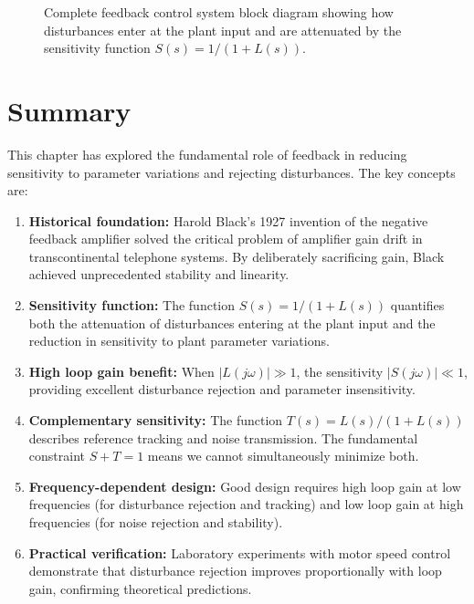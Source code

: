 \begin{figure}[htbp]
\begin{tikzpicture}[auto, node distance=2.2cm, >=latex', scale=0.85, transform shape]
\end{tikzpicture}
\caption{Complete feedback control system block diagram showing how disturbances enter at the plant input and are attenuated by the sensitivity function $S(s) = 1/(1+L(s))$.}
\label{fig:complete_block_diagram}
\end{figure}

\section{Summary}
\label{sec:summary}

This chapter has explored the fundamental role of feedback in reducing sensitivity to parameter variations and rejecting disturbances. The key concepts are:

\begin{enumerate}
\item \textbf{Historical foundation:} Harold Black's 1927 invention of the negative feedback amplifier solved the critical problem of amplifier gain drift in transcontinental telephone systems. By deliberately sacrificing gain, Black achieved unprecedented stability and linearity.

\item \textbf{Sensitivity function:} The function $S(s) = 1/(1+L(s))$ quantifies both the attenuation of disturbances entering at the plant input and the reduction in sensitivity to plant parameter variations.

\item \textbf{High loop gain benefit:} When $|L(j\omega)| \gg 1$, the sensitivity $|S(j\omega)| \ll 1$, providing excellent disturbance rejection and parameter insensitivity.

\item \textbf{Complementary sensitivity:} The function $T(s) = L(s)/(1+L(s))$ describes reference tracking and noise transmission. The fundamental constraint $S + T = 1$ means we cannot simultaneously minimize both.

\item \textbf{Frequency-dependent design:} Good design requires high loop gain at low frequencies (for disturbance rejection and tracking) and low loop gain at high frequencies (for noise rejection and stability).

\item \textbf{Practical verification:} Laboratory experiments with motor speed control demonstrate that disturbance rejection improves proportionally with loop gain, confirming theoretical predictions.
\end{enumerate}

